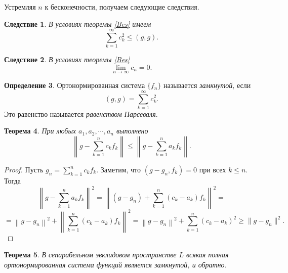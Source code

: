 \documentclass[12pt, titlepage, oneside]{amsbook}
\newtheorem{theorem}{Теорема}[chapter]
\newtheorem{corollary}[theorem]{Следствие}
\theoremstyle{definition}
\newtheorem{definition}[theorem]{Определение}
\theoremstyle{remark}
\begin{document}
Устремляя $n$ к бесконечности, получаем следующие следствия.

\begin{corollary}
	\label{Bes2}
	В условиях теоремы \ref{Bes} имеем $$\sum\limits_{k=1}^{\infty} c_k^2\leq(g,g).$$
\end{corollary}

\begin{corollary}
	\label{Bes3}
	В условиях теоремы \ref{Bes} $$\lim\limits_{n\rightarrow\infty} c_n=0.$$
\end{corollary}

\begin{definition}
	Ортонормированная система $\{f_n\}$ называется \emph{замкнутой}, если $$(g,g)=\sum\limits_{k=1}^{\infty} c_k^2.$$ Это равенство называется \emph{равенством Парсеваля}.
\end{definition}

\begin{theorem}
	\label{Bes4}
	При любых $a_1,a_2,\cdots, a_n$ выполнено $$\left\|g-\sum\limits_{k=1}^{n} c_k f_k\right\|\leq\left\|g-\sum\limits_{k=1}^{n} a_k f_k\right\|.$$
\end{theorem}

\begin{proof}
	Пусть $g_n=\sum\limits_{k=1}^{n} c_k f_k$. Заметим, что $(g-g_n,f_k)=0$ при всех $k\leq n$. Тогда $$\left\|g-\sum\limits_{k=1}^{n} a_k f_k\right\|^2=\left\|(g-g_n)+\sum\limits_{k=1}^{n}(c_k-a_k) f_k\right\|^2=$$ $$=\left\|g-g_n\right\|^2+\left\|\sum\limits_{k=1}^{n}(c_k-a_k) f_k\right\|^2=\left\|g-g_n\right\|^2+\sum\limits_{k=1}^{n}(c_k-a_k)^2\geq\|g-g_n\|^2.$$
\end{proof}

\begin{theorem}
	\label{Bes5}
	В сепарабельном эвклидовом пространстве $L$ всякая полная ортонормированная система функций является замкнутой, и обратно.
\end{theorem}
\end{document}
